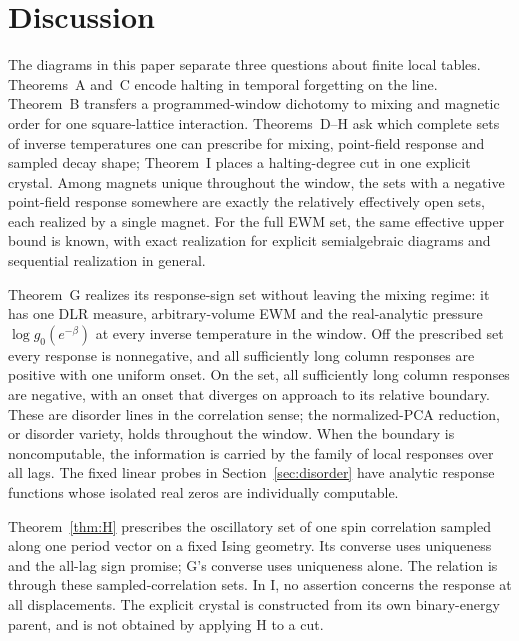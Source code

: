 \section{Discussion}\label{sec:discussion}

The diagrams in this paper separate three questions about finite local tables. Theorems~A and~C encode halting in temporal forgetting on the line. Theorem~B transfers a programmed-window dichotomy to mixing and magnetic order for one square-lattice interaction. Theorems~D--H ask which complete sets of inverse temperatures one can prescribe for mixing, point-field response and sampled decay shape; Theorem~I places a halting-degree cut in one explicit crystal. Among magnets unique throughout the window, the sets with a negative point-field response somewhere are exactly the relatively effectively open sets, each realized by a single magnet. For the full EWM set, the same effective upper bound is known, with exact realization for explicit semialgebraic diagrams and sequential realization in general.

Theorem~G realizes its response-sign set without leaving the mixing regime: it has one DLR measure, arbitrary-volume EWM and the real-analytic pressure \(\log g_0(e^{-\beta})\) at every inverse temperature in the window. Off the prescribed set every response is nonnegative, and all sufficiently long column responses are positive with one uniform onset. On the set, all sufficiently long column responses are negative, with an onset that diverges on approach to its relative boundary. These are disorder lines in the correlation sense; the normalized-PCA reduction, or disorder variety, holds throughout the window. When the boundary is noncomputable, the information is carried by the family of local responses over all lags. The fixed linear probes in Section~\ref{sec:disorder} have analytic response functions whose isolated real zeros are individually computable.

Theorem~\ref{thm:H} prescribes the oscillatory set of one spin correlation sampled along one period vector on a fixed Ising geometry. Its converse uses uniqueness and the all-lag sign promise; G's converse uses uniqueness alone. The relation is through these sampled-correlation sets. In I, no assertion concerns the response at all displacements. The explicit crystal is constructed from its own binary-energy parent, and is not obtained by applying H to a cut.

